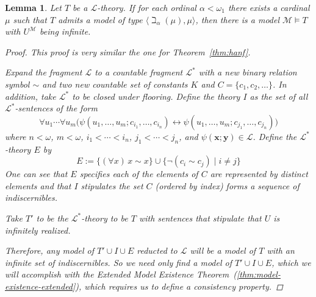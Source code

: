 \documentclass{amsart}
\newtheorem{lemma}[theorem]{Lemma}
\theoremstyle{definition}
\numberwithin{equation}{theorem}
\newcommand{\V}{\mathbf}
\newcommand{\frag}{\mathcal{L}}
\begin{document}
  \begin{lemma}
    Let $T$ be a $\frag$-theory.
    If for each ordinal $\alpha<\omega_1$ there exists a cardinal $\mu$ such that $T$ admits a model of type $\langle\beth_{\alpha}(\mu),\mu\rangle$, then there is a model $\mathcal M\models T$ with $U^\mathcal M$ being infinite.
    \begin{proof}
      This proof is very similar the one for Theorem~\ref{thm:hanf}. 
      
      Expand the fragment $\frag$ to a countable fragment $\frag^*$ with a new binary relation symbol $\sim$ and two new countable set of constants $K$ and $C=\{c_1,c_2,\dots\}$.
      In addition, take $\frag^*$ to be closed under flooring.
    Define the theory $I$ as the set of all $\frag^*$-sentences of the form
    \[
      \forall u_1\cdots\forall u_m\Big(\psi(u_1,\dots,u_m;c_{i_1},\dots,c_{i_n})\leftrightarrow \psi(u_1,\dots,u_m;c_{j_1},\dots,c_{j_n})\Big)
    \]
    where $n<\omega$, $m<\omega$, $i_1<\cdots<i_n$, $j_1<\cdots<j_n$, and $\psi(\V x;\V y)\in\frag$.
    Define the $\frag^*$-theory $E$ by
    \[
      E:=\{(\forall x)\,x\sim x\}\cup\{\neg(c_i\sim c_j) \mid i\neq j\}
    \]
    One can see that $E$ specifies each of the elements of $C$ are represented by distinct elements and that $I$ stipulates the set $C$ (ordered by index) forms a sequence of indiscernibles.
    
    Take $T'$ to be the $\frag^*$-theory to be $T$ with sentences that stipulate that $U$ is infinitely realized.
    
    Therefore, any model of $T'\cup I\cup E$ reducted to $\frag$ will be a model of $T$ with an infinite set of indiscernibles.
    So we need only find a model of $T'\cup I\cup E$, which we will accomplish with the Extended Model Existence Theorem~(\ref{thm:model-existence-extended}), which requires us to define a consistency property.
    

\end{proof}
\end{lemma}
\end{document}

